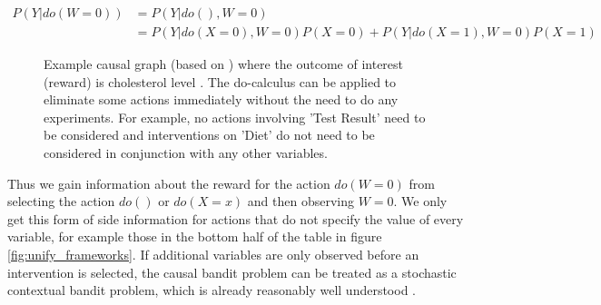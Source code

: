 \documentclass[11pt,a4paper,twoside]{report}
\newcommand{\eq}[1]{\begin{align*}#1\end{align*}}
\theoremstyle{plain}
\theoremstyle{definition}
\begin{document}
\eq{
P(Y|do(W = 0)) &= P(Y|do(),W = 0) \\
&= P(Y|do(X=0),W=0)P(X=0)+P(Y|do(X=1),W=0)P(X=1) 
}

\begin{figure}
\centering
{}
\caption{Example causal graph (based on \citet{Koller2009}) where the outcome of interest (reward) is cholesterol level . The do-calculus can be applied to eliminate some actions immediately without the need to do any experiments. For example, no actions involving 'Test Result' need to be considered and interventions on 'Diet' do not need to be considered in conjunction with any other variables.}
\label{fig:cholesterol_graph}
\end{figure}

Thus we gain information about the reward for the action $do(W=0)$ from selecting the action $do()$ or $do(X = x)$ and then observing $W = 0$.  We only get this form of side information for actions that do not specify the value of every variable, for example those in the bottom half of the table in figure \ref{fig:unify_frameworks}. If additional variables are only observed before an intervention is selected, the causal bandit problem can be treated as a stochastic contextual bandit problem, which is already reasonably well understood \citep{Agarwal2014}.
\end{document}
